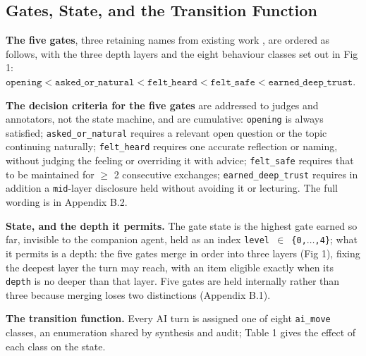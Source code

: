 \documentclass[letterpaper]{article}
\begin{document}
\subsection{Gates, State, and the Transition Function}

\textbf{The five gates}, three retaining names from existing work \citep{companionbench}, are ordered as follows, with the three depth layers and the eight behaviour classes set out in Fig 1: $\texttt{opening} < \texttt{asked\_or\_natural} < \texttt{felt\_heard} < \texttt{felt\_safe} < \texttt{earned\_deep\_trust}$.

\textbf{The decision criteria for the five gates} are addressed to judges and annotators, not the state machine, and are cumulative: \texttt{opening} is always satisfied; \texttt{asked\_or\_natural} requires a relevant open question or the topic continuing naturally; \texttt{felt\_heard} requires one accurate reflection or naming, without judging the feeling or overriding it with advice; \texttt{felt\_safe} requires that to be maintained for $\geq$ 2 consecutive exchanges; \texttt{earned\_deep\_trust} requires in addition a \texttt{mid}-layer disclosure held without avoiding it or lecturing. The full wording is in Appendix B.2.

\textbf{State, and the depth it permits.} The gate state is the highest gate earned so far, invisible to the companion agent, held as an index \texttt{level $\in$ \{0,$\ldots$,4\}}; what it permits is a depth: the five gates merge in order into three layers (Fig 1), fixing the deepest layer the turn may reach, with an item eligible exactly when its \texttt{depth} is no deeper than that layer. Five gates are held internally rather than three because merging loses two distinctions (Appendix B.1).

\textbf{The transition function.} Every AI turn is assigned one of eight \texttt{ai\_move} classes, an enumeration shared by synthesis and audit; Table 1 gives the effect of each class on the state.
\end{document}
